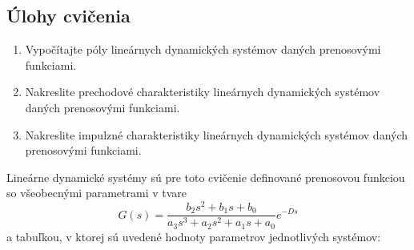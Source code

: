 \documentclass[a4paper, 10pt, ]{article}
\begin{document}
\subsection{Úlohy cvičenia}

\begin{enumerate}[leftmargin=0pt, labelsep=4mm, itemsep=0pt]

	\item Vypočítajte póly lineárnych dynamických systémov daných prenosovými funkciami.

	\item Nakreslite prechodové charakteristiky lineárnych dynamických systémov daných prenosovými funkciami.

	\item Nakreslite impulzné charakteristiky lineárnych dynamických systémov daných prenosovými funkciami.

\end{enumerate}


\noindent
Lineárne dynamické systémy sú pre toto cvičenie definované prenosovou funkciou so všeobecnými parametrami v tvare
\begin{equation*}
	G(s) = \frac{b_2 s^2 + b_1 s + b_0}{a_3 s^3 + a_2 s^2 + a_1 s + a_0} e^{-Ds}
\end{equation*}
a tabuľkou, v ktorej sú uvedené hodnoty parametrov jednotlivých systémov:



\bigskip
\end{document}
